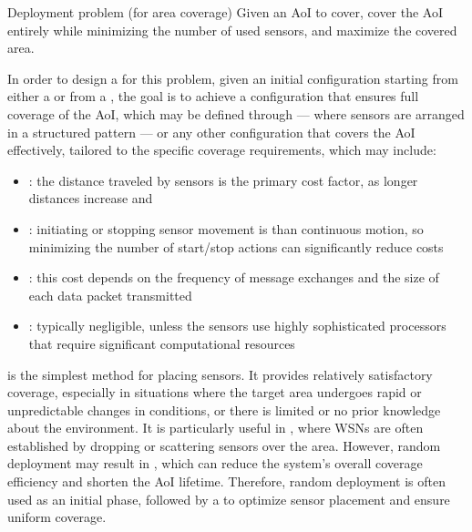\documentclass[a4paper, 12pt]{report}
\begin{document}
    \begin{frameddefn}{Deployment problem (for area coverage)}
        Given an AoI to cover, cover the AoI entirely while minimizing the number of used sensors, and maximize the covered area.
    \end{frameddefn}

    In order to design a  for this problem, given an initial configuration starting from either a  or from a , the goal is to achieve a configuration that ensures full coverage of the AoI, which may be defined through  --- where sensors are arranged in a structured pattern --- or any other configuration that covers the AoI effectively, tailored to the specific coverage requirements, which may include:

    \begin{itemize}
        \item {}: the distance traveled by sensors is the primary cost factor, as longer distances increase  and 
        \item {}: initiating or stopping sensor movement is  than continuous motion, so minimizing the number of start/stop actions can significantly reduce costs
        \item {}: this cost depends on the frequency of message exchanges and the size of each data packet transmitted
        \item {}: typically negligible, unless the sensors use highly sophisticated processors that require significant computational resources
    \end{itemize}

     is the simplest method for placing sensors. It provides relatively satisfactory coverage, especially in situations where the target area undergoes rapid or unpredictable changes in conditions, or there is limited or no prior knowledge about the environment. It is particularly useful in , where WSNs are often established by dropping or scattering sensors over the area. However, random deployment may result in , which can reduce the system's overall coverage efficiency and shorten the AoI lifetime. Therefore, random deployment is often used as an initial phase, followed by a  to optimize sensor placement and ensure uniform coverage.
\end{document}

